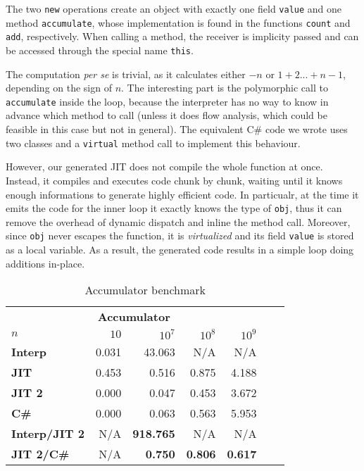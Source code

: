 The two \lstinline{new} operations create an object with exactly one field
\lstinline{value} and one method \lstinline{accumulate}, whose implementation
is found in the functions \lstinline{count} and \lstinline{add}, respectively.
When calling a method, the receiver is implicity passed and can be accessed
through the special name \lstinline{this}.

The computation \emph{per se} is trivial, as it calculates either $-n$ or
$1+2...+n-1$, depending on the sign of $n$. The interesting part is the
polymorphic call to \lstinline{accumulate} inside the loop, because the interpreter has
no way to know in advance which method to call (unless it does flow analysis,
which could be feasible in this case but not in general).  The equivalent C\#
code we wrote uses two classes and a \lstinline{virtual} method call to
implement this behaviour.

However, our generated JIT does not compile the whole function at
once. Instead, it compiles and executes code chunk by chunk, waiting until it
knows enough informations to generate highly efficient code.  In particualr,
at the time it emits the code for the inner loop it exactly knows the
type of \lstinline{obj}, thus it can remove the overhead of dynamic dispatch
and inline the method call.  Moreover, since \lstinline{obj} never escapes the
function, it is \emph{virtualized} and its field \lstinline{value} is stored
as a local variable.  As a result, the generated code results in a simple loop
doing additions in-place.

\begin{table}[ht]
  \begin{center}

  \begin{tabular}{l|rrrrrr}
    \multicolumn{5}{c}{\textbf{Accumulator}} \\ [0.5ex]

    \textbf{$n$}          & $10$  & $10^7$           & $10^8$         & $10^9$         \\
    \hline
    \textbf{Interp}       & 0.031 & 43.063           & N/A            & N/A            \\
    \textbf{JIT}          & 0.453 &  0.516           & 0.875          & 4.188          \\
    \textbf{JIT 2}        & 0.000 &  0.047           & 0.453          & 3.672          \\
    \textbf{C\#}          & 0.000 &  0.063           & 0.563          & 5.953          \\
    \textbf{Interp/JIT 2} & N/A   & \textbf{918.765} & N/A            & N/A            \\
    \textbf{JIT 2/C\#}    & N/A   & \textbf{0.750}   & \textbf{0.806} & \textbf{0.617} \\

  \end{tabular}
  \end{center}
  \caption{Accumulator benchmark}
  \label{tab:accumulator}
\end{table}






